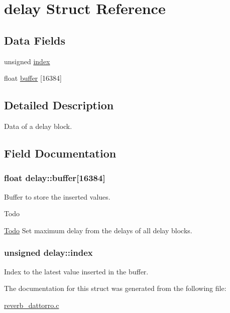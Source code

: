 \hypertarget{structdelay}{\section{delay Struct Reference}
\label{structdelay}
}
\subsection*{Data Fields}
\begin{DoxyCompactItemize}
\item 
unsigned \hyperlink{structdelay_ad94bb0da4af737feaa3e6136199fb7d6}{index}
\item 
float \hyperlink{structdelay_a655d8b9f8d1bcd90764042b7e6e58ea7}{buffer} \mbox{[}16384\mbox{]}
\end{DoxyCompactItemize}


\subsection{Detailed Description}
Data of a delay block. 

\subsection{Field Documentation}
\hypertarget{structdelay_a655d8b9f8d1bcd90764042b7e6e58ea7}{
\subsubsection[{buffer}]{\setlength{\rightskip}{0pt plus 5cm}float delay\-::buffer\mbox{[}16384\mbox{]}}}\label{structdelay_a655d8b9f8d1bcd90764042b7e6e58ea7}
Buffer to store the inserted values. \begin{DoxyRefDesc}{Todo}
\item[\hyperlink{todo__todo000014}{Todo}]Set maximum delay from the delays of all delay blocks. \end{DoxyRefDesc}
\hypertarget{structdelay_ad94bb0da4af737feaa3e6136199fb7d6}{
\subsubsection[{index}]{\setlength{\rightskip}{0pt plus 5cm}unsigned delay\-::index}}\label{structdelay_ad94bb0da4af737feaa3e6136199fb7d6}
Index to the latest value inserted in the buffer. 

The documentation for this struct was generated from the following file\-:\begin{DoxyCompactItemize}
\item 
\hyperlink{reverb__dattorro_8c}{reverb\-\_\-dattorro.\-c}\end{DoxyCompactItemize}
